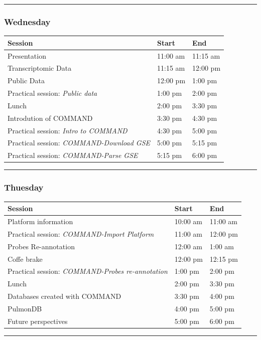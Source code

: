 \documentclass[]{article}
\begin{document}
\begin{center}\rule{0.5\linewidth}{\linethickness}\end{center}

\subsubsection{Wednesday}\label{wednesday}

\begin{longtable}[]{@{}lll@{}}
\toprule
Session & Start & End\tabularnewline
\midrule
\endhead
Presentation & 11:00 am & 11:15 am\tabularnewline
Transcriptomic Data & 11:15 am & 12:00 pm\tabularnewline
Public Data & 12:00 pm & 1:00 pm\tabularnewline
 Practical session: \emph{Public data} & 1:00 pm & 2:00
pm\tabularnewline
 Lunch & 2:00 pm & 3:30 pm\tabularnewline
Introdution of COMMAND & 3:30 pm & 4:30 pm\tabularnewline
 Practical session: \emph{Intro to COMMAND} & 4:30 pm & 5:00
pm\tabularnewline
 Practical session: \emph{COMMAND-Download GSE} & 5:00 pm & 5:15
pm\tabularnewline
 Practical session: \emph{COMMAND-Parse GSE} & 5:15 pm & 6:00
pm\tabularnewline
\bottomrule
\end{longtable}

\begin{center}\rule{0.5\linewidth}{\linethickness}\end{center}

\subsubsection{Thuesday}\label{thuesday}

\begin{longtable}[]{@{}lll@{}}
\toprule
Session & Start & End\tabularnewline
\midrule
\endhead
Platform information & 10:00 am & 11:00 am\tabularnewline
 Practical session: \emph{COMMAND-Import Platform} & 11:00 am & 12:00
pm\tabularnewline
Probes Re-annotation & 12:00 am & 1:00 am\tabularnewline
 Coffe brake & 12:00 pm & 12:15 pm\tabularnewline
 Practical session: \emph{COMMAND-Probes re-annotation} & 1:00 pm & 2:00
pm\tabularnewline
 Lunch & 2:00 pm & 3:30 pm\tabularnewline
Databases created with COMMAND & 3:30 pm & 4:00 pm\tabularnewline
PulmonDB & 4:00 pm & 5:00 pm\tabularnewline
Future perspectives & 5:00 pm & 6:00 pm\tabularnewline
\bottomrule
\end{longtable}

\begin{center}\rule{0.5\linewidth}{\linethickness}\end{center}
\end{document}
